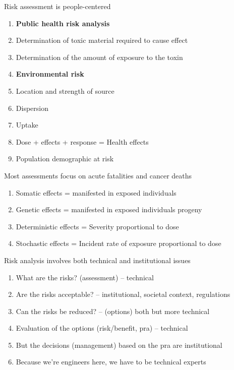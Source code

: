 \documentclass[aspectratio=1610,pdftex,dvipsnames,compress,xcolor={dvipsnames}]{beamer}
\newcommand{\acs}{\acrshort} %
\begin{document}
\begin{frame}{Risk assessment is people-centered}
    \begin{enumerate}[series=outerlist,topsep=0pt,itemsep=1pt,leftmargin=*,label=(\arabic*)]
        \item[]\textbf{Public health risk analysis}
        \item[]Determination of toxic material required to cause effect
        \item[]Determination of the amount of exposure to the toxin
            \vspace{0.15in}
        \item[]\textbf{Environmental risk}
        \item[]Location and strength of source  
        \item[]Dispersion
        \item[]Uptake
        \item[]Dose + effects + response = Health effects  
        \item[]Population demographic at risk  
    \end{enumerate}
\end{frame}


\begin{frame}{Most assessments focus on acute fatalities and cancer deaths}
    \begin{enumerate}[series=outerlist,topsep=0pt,itemsep=21pt,leftmargin=*,label=(\arabic*)]
        \item[]Somatic effects = manifested in exposed individuals
        \item[]Genetic effects = manifested in exposed individuals progeny
        \item[]Deterministic effects = Severity proportional to dose
        \item[]Stochastic effects = Incident rate of exposure proportional to dose
    \end{enumerate}
\end{frame}


\begin{frame}{Risk analysis involves both technical and institutional issues}
    \begin{enumerate}[series=outerlist,topsep=0pt,itemsep=15pt,leftmargin=*,label=(\arabic*)]
        \item[]What are the risks? (assessment) -- technical
        \item[]Are the risks acceptable? -- institutional, societal context, regulations
        \item[]Can the risks be reduced? -- (options) both but more technical
        \item[]Evaluation of the options (risk/benefit, \acs{pra}) -- technical
        \item[]But the decisions (management) based on the \acs{pra} are institutional
        \item[]Because we're engineers here, we have to be technical experts
    \end{enumerate}
\end{frame}
\end{document}
